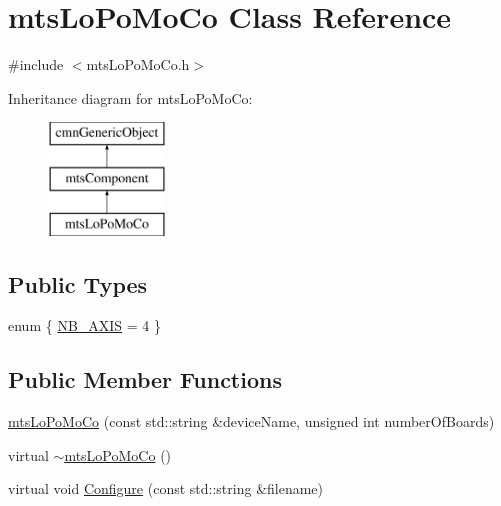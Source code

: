 \hypertarget{classmts_lo_po_mo_co}{\section{mts\-Lo\-Po\-Mo\-Co Class Reference}
\label{classmts_lo_po_mo_co}
}


{\ttfamily \#include $<$mts\-Lo\-Po\-Mo\-Co.\-h$>$}

Inheritance diagram for mts\-Lo\-Po\-Mo\-Co\-:\begin{figure}[H]
\begin{center}
\leavevmode
\includegraphics[height=3.000000cm]{d9/d04/classmts_lo_po_mo_co}
\end{center}
\end{figure}
\subsection*{Public Types}
\begin{DoxyCompactItemize}
\item 
enum \{ \hyperlink{classmts_lo_po_mo_co_a364fb83f87aad0f9125c684157520496ac6dba0b930a9af0a1804587423ca4878}{N\-B\-\_\-\-A\-X\-I\-S} = 4
 \}
\end{DoxyCompactItemize}
\subsection*{Public Member Functions}
\begin{DoxyCompactItemize}
\item 
\hyperlink{classmts_lo_po_mo_co_a43e47d59bc0d7c596393e6cde9925102}{mts\-Lo\-Po\-Mo\-Co} (const std\-::string \&device\-Name, unsigned int number\-Of\-Boards)
\item 
virtual \hyperlink{classmts_lo_po_mo_co_a2f64ffac304c55dd2f63896711cf23d7}{$\sim$mts\-Lo\-Po\-Mo\-Co} ()
\item 
virtual void \hyperlink{classmts_lo_po_mo_co_aa597d72647d0187b9f601973a7a1077b}{Configure} (const std\-::string \&filename)
\end{DoxyCompactItemize}

